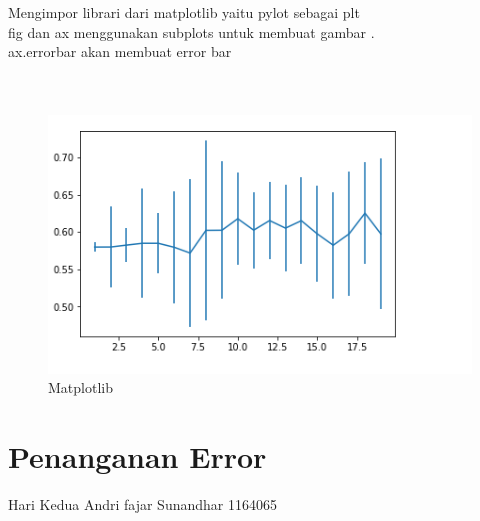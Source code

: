 \begin{enumerate}
\par
Mengimpor librari dari matplotlib yaitu pylot sebagai plt\\
fig dan ax menggunakan subplots untuk membuat gambar .\\
ax.errorbar akan membuat error bar
\\
\\
\\
\begin{figure}[ht]
\centering
\includegraphics[scale=0.5]{figures/spyder/12.png}
\caption{Matplotlib}
\label{Spyder}
\end{figure}
\end{enumerate}

\section{Penanganan Error}
Hari Kedua Andri fajar Sunandhar 1164065
